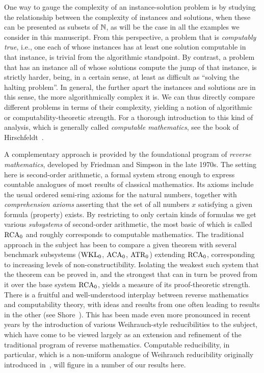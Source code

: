 One way to gauge the complexity of an instance-solution problem is by studying the relationship between the complexity of instances and solutions, when these can be presented as subsets of $\mathbb{N}$, as will be the case in all the examples we consider in this manuscript. From this perspective, a problem that is \emph{computably true}, i.e., one each of whose instances has at least one solution computable in that instance, is trivial from the algorithmic standpoint. By contrast, a problem that has an instance all of whose solutions compute the jump of that instance, is strictly harder, being, in a certain sense, at least as difficult as ``solving the halting problem''. In general, the further apart the instances and solutions are in this sense, the more algorithmically complex it is. We can thus directly compare different problems in terms of their complexity, yielding a notion of algorithmic or computability-theoretic strength. For a thorough introduction to this kind of analysis, which is generally called \emph{computable mathematics}, see the book of Hirschfeldt~\cite{Hirschfeldt2015Slicing}.


A complementary approach is provided by the foundational program of \emph{reverse mathematics}, developed by Friedman and Simpson in the late 1970s. The setting here is second-order arithmetic, a formal system strong enough to express countable analogues of most results of classical mathematics. Its axioms include the usual ordered semi-ring axioms for the natural numbers, together with \emph{comprehension axioms} asserting that the set of all numbers $x$ satisfying a given formula (property) exists. By restricting to only certain kinds of formulas we get various \emph{subsystems} of second-order arithmetic, the most basic of which is called $\mathrm{RCA}_0$ and roughly corresponds to computable mathematics. The traditional approach in the subject has been to compare a given theorem with several benchmark subsystems ($\mathrm{WKL}_0$, $\mathrm{ACA}_0$, $\mathrm{ATR}_0$) extending $\mathrm{RCA}_0$, corresponding to increasing levels of non-constructibility. Isolating the weakest such system that the theorem can be proved in, and the strongest that can in turn be proved from it over the base system $\mathrm{RCA}_0$, yields a measure of its proof-theoretic strength. There is a fruitful and well-understood interplay between reverse mathematics and computability theory, with ideas and results from one often leading to results in the other (see Shore~\cite{Shore1975Splitting}). This has been made even more pronounced in recent years by the introduction of various Weihrauch-style reducibilities to the subject, which have come to be viewed largely as an extension and refinement of the traditional program of reverse mathematics. Computable reducibility, in particular, which is a non-uniform analogue of Weihrauch reducibility originally introduced in~\cite{Dzhafarov2014Cohesive}, will figure in a number of our results here.


